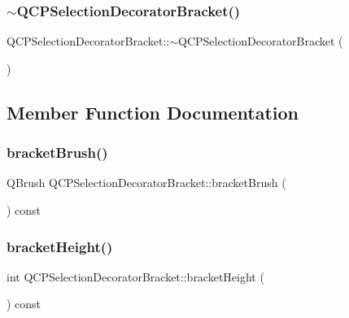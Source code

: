 \subsubsection{\texorpdfstring{$\sim$QCPSelectionDecoratorBracket()}{~QCPSelectionDecoratorBracket()}}
{\footnotesize\ttfamily Q\+C\+P\+Selection\+Decorator\+Bracket\+::$\sim$\+Q\+C\+P\+Selection\+Decorator\+Bracket (\begin{DoxyParamCaption}{ }\end{DoxyParamCaption})\hspace{0.3cm}{\ttfamily [virtual]}}



\subsection{Member Function Documentation}
\mbox{\label{class_q_c_p_selection_decorator_bracket_ac5e409d6b62f0b71143fb8a526fe59a9}} 
\subsubsection{\texorpdfstring{bracketBrush()}{bracketBrush()}}
{\footnotesize\ttfamily Q\+Brush Q\+C\+P\+Selection\+Decorator\+Bracket\+::bracket\+Brush (\begin{DoxyParamCaption}{ }\end{DoxyParamCaption}) const\hspace{0.3cm}{\ttfamily [inline]}}

\mbox{\label{class_q_c_p_selection_decorator_bracket_a531d9c953a7279db93611248e115edab}} 
\subsubsection{\texorpdfstring{bracketHeight()}{bracketHeight()}}
{\footnotesize\ttfamily int Q\+C\+P\+Selection\+Decorator\+Bracket\+::bracket\+Height (\begin{DoxyParamCaption}{ }\end{DoxyParamCaption}) const\hspace{0.3cm}{\ttfamily [inline]}}

